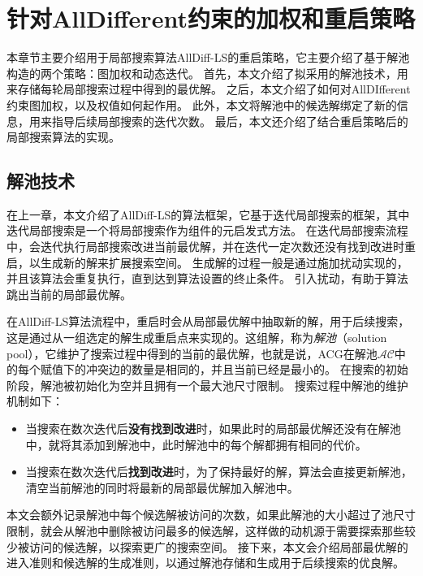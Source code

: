 \chapter{针对AllDifferent约束的加权和重启策略}\label{chap:method}

本章节主要介绍用于局部搜索算法AllDiff-LS的重启策略，它主要介绍了基于解池构造的两个策略：图加权和动态迭代。
首先，本文介绍了拟采用的解池技术，用来存储每轮局部搜索过程中得到的最优解。
之后，本文介绍了如何对AllDIfferent约束图加权，以及权值如何起作用。
此外，本文将解池中的候选解绑定了新的信息，用来指导后续局部搜索的迭代次数。
最后，本文还介绍了结合重启策略后的局部搜索算法的实现。

\section{解池技术}
在上一章，本文介绍了AllDiff-LS的算法框架，它基于迭代局部搜索的框架，其中迭代局部搜索是一个将局部搜索作为组件的元启发式方法。
在迭代局部搜索流程中，会迭代执行局部搜索改进当前最优解，并在迭代一定次数还没有找到改进时重启，以生成新的解来扩展搜索空间。
生成解的过程一般是通过施加扰动实现的，并且该算法会重复执行，直到达到算法设置的终止条件。
引入扰动，有助于算法跳出当前的局部最优解。

在AllDiff-LS算法流程中，重启时会从局部最优解中抽取新的解，用于后续搜索，这是通过从一组选定的解生成重启点来实现的。这组解，称为\textit{解池}（solution pool）\cite{dong2013multi}，它维护了搜索过程中得到的当前的最优解，也就是说，ACG在解池$\mathcal{AC}$中的每个赋值下的冲突边的数量是相同的，并且当前已经是最小的。
在搜索的初始阶段，解池被初始化为空并且拥有一个最大池尺寸限制。
搜索过程中解池的维护机制如下：
\begin{itemize}
    \item 当搜索在数次迭代后\textbf{没有找到改进}时，如果此时的局部最优解还没有在解池中，就将其添加到解池中，此时解池中的每个解都拥有相同的代价。
    \item 当搜索在数次迭代后\textbf{找到改进}时，为了保持最好的解，算法会直接更新解池，清空当前解池的同时将最新的局部最优解加入解池中。
\end{itemize}

本文会额外记录解池中每个候选解被访问的次数，如果此解池的大小超过了池尺寸限制，就会从解池中删除被访问最多的候选解，这样做的动机源于需要探索那些较少被访问的候选解，以探索更广的搜索空间。
接下来，本文会介绍局部最优解的进入准则和候选解的生成准则，以通过解池存储和生成用于后续搜索的优良解。

